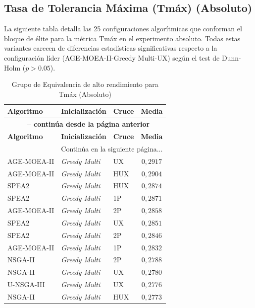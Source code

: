\subsection{Tasa de Tolerancia Máxima (Tmáx) (Absoluto)}\label{anexo:elite_maxt_abs}

La siguiente tabla detalla las 25 configuraciones algorítmicas que conforman el bloque de élite para la métrica Tmáx en el experimento absoluto. Todas estas variantes carecen de diferencias estadísticas significativas respecto a la configuración líder (AGE-MOEA-II-Greedy Multi-UX) según el test de Dunn-Holm ($p > 0.05$).

\begin{longtable}{lllc}
    \caption{Grupo de Equivalencia de alto rendimiento para Tmáx (Absoluto)}
    \label{tab:elite_maxt_abs} \\
    \toprule
    \textbf{Algoritmo} & \textbf{Inicialización} & \textbf{Cruce} & \textbf{Media} \\
    \midrule
    \endfirsthead
    \multicolumn{4}{c}{{\bfseries \tablename\ \thetable{} -- continúa desde la página anterior}} \\
    \toprule
    \textbf{Algoritmo} & \textbf{Inicialización} & \textbf{Cruce} & \textbf{Media} \\
    \midrule
    \endhead
    \midrule \multicolumn{4}{r}{{Continúa en la siguiente página...}} \\
    \endfoot
    \bottomrule
    \endlastfoot
    AGE-MOEA-II & \textit{Greedy Multi} & UX & $0{,}2917$ \\
AGE-MOEA-II & \textit{Greedy Multi} & HUX & $0{,}2904$ \\
SPEA2 & \textit{Greedy Multi} & HUX & $0{,}2874$ \\
SPEA2 & \textit{Greedy Multi} & 1P & $0{,}2871$ \\
AGE-MOEA-II & \textit{Greedy Multi} & 2P & $0{,}2858$ \\
SPEA2 & \textit{Greedy Multi} & UX & $0{,}2851$ \\
SPEA2 & \textit{Greedy Multi} & 2P & $0{,}2846$ \\
AGE-MOEA-II & \textit{Greedy Multi} & 1P & $0{,}2832$ \\
NSGA-II & \textit{Greedy Multi} & 2P & $0{,}2788$ \\
NSGA-II & \textit{Greedy Multi} & UX & $0{,}2780$ \\
U-NSGA-III & \textit{Greedy Multi} & UX & $0{,}2776$ \\
NSGA-II & \textit{Greedy Multi} & HUX & $0{,}2773$ \\

\end{longtable}
